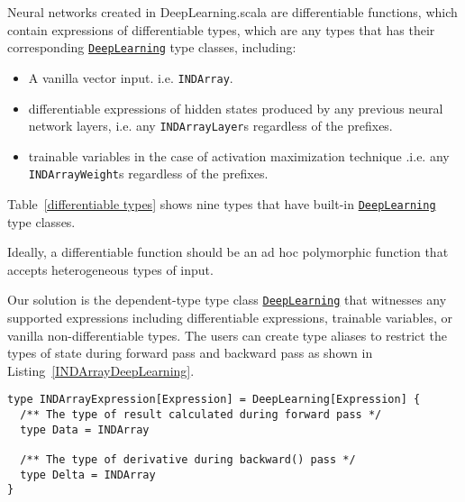 Neural networks created in DeepLearning.scala are \glspl{differentiable function}, which contain expressions of differentiable types, which are any types that has their corresponding \href{https://javadoc.io/page/com.thoughtworks.deeplearning/deeplearning_2.11/latest/com/thoughtworks/deeplearning/DeepLearning.html}{\lstinline{DeepLearning}} type classes, including:

\begin{itemize}
  
  \item A vanilla vector input. i.e. \lstinline{INDArray}.

  \item \Glspl{differentiable expression} of hidden states produced by any previous neural network layers, i.e. any \lstinline{INDArrayLayer}s regardless of the prefixes.
  
  \item \Glspl{trainable variable} in the case of activation maximization technique \cite{erhan2009visualizing}.i.e. any \lstinline{INDArrayWeight}s regardless of the prefixes.

\end{itemize}

Table~\ref{differentiable types} shows nine types that have built-in \href{https://javadoc.io/page/com.thoughtworks.deeplearning/deeplearning_2.11/latest/com/thoughtworks/deeplearning/DeepLearning.html}{\lstinline{DeepLearning}} type classes.

Ideally, a differentiable function should be an ad hoc polymorphic function that accepts heterogeneous types of input.

Our solution is the dependent-type type class \cite{gurnelltype} \href{https://javadoc.io/page/com.thoughtworks.deeplearning/deeplearning_2.11/latest/com/thoughtworks/deeplearning/DeepLearning.html}{\lstinline{DeepLearning}} that witnesses any supported expressions including \glspl{differentiable expression}, \glspl{trainable variable}, or vanilla non-differentiable types. The users can create type aliases to restrict the types of state during forward pass and backward pass as shown in Listing~\ref{INDArrayDeepLearning}.

\begin{lstlisting}[float={h t b p},caption={A type class alias that witnesses dense vector expressions}, label={INDArrayDeepLearning}]
type INDArrayExpression[Expression] = DeepLearning[Expression] {
  /** The type of result calculated during forward pass */
  type Data = INDArray

  /** The type of derivative during backward() pass */
  type Delta = INDArray
}
\end{lstlisting}

